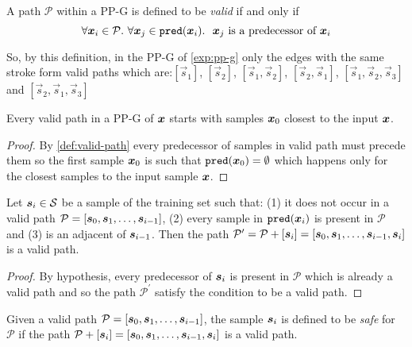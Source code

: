 \begin{definition}
\label{def:valid-path}
A path $\mathcal{P}$ within a \acs{PP-G} is defined to be \emph{valid} if and only if
\[
  \forall \x[i] \in \mathcal{P}.\ \forall \x[j] \in \pred{\x[i]}. \ \ \x[j] \text{ is a predecessor of } \x[i]
\]
\end{definition}

So, by this definition, in the \acs{PP-G} of \autoref{exp:pp-g} only the edges with the same stroke form valid paths which are:$[\vec{s}_1]$, $[\vec{s}_2]$, $[\vec{s}_1, \vec{s}_2]$, $[\vec{s}_2, \vec{s}_1]$, $[\vec{s}_1, \vec{s}_2, \vec{s}_3]$ and $[\vec{s}_2, \vec{s}_1, \vec{s}_3]$

\begin{proposition}
  \label{prop:starting-sample}
Every valid path in a \acs{PP-G} of $\vinput$ starts with samples $\x[0]$ closest to the input $\vinput$.
\end{proposition}
\begin{proof}
By \autoref{def:valid-path} every predecessor of samples in valid path must precede them so the first sample $\x[0]$ is such that $\pred{\x[0]} = \emptyset$ which happens only for the closest samples to the input sample $\vinput$.
\end{proof}

\begin{proposition}
\label{prop:safe-condition}
  Let $\sample[i] \in \set$ be a sample of the training set such that: (1) it does not occur in a valid path $\mathcal{P} = [\sample[0], \sample[1],\ldots, \sample[i-1]]$, (2) every sample in $\pred{\x[i]}$ is present in $\mathcal{P}$ and (3) is an adjacent of $\sample[i-1]$. Then the path $\mathcal{P}^\prime = \mathcal{P} + [\sample[i]]=[\sample[0], \sample[1],\ldots, \sample[i-1], \sample[i]]$ is a valid path.
\end{proposition}
\begin{proof}
By hypothesis, every predecessor of $\sample[i]$ is present in $\mathcal{P}$ which is already a valid path and so the path $\mathcal{P}^\prime$ satisfy the condition to be a valid path.
\end{proof}

\begin{definition}
\label{def:safe-sample}
Given a valid path $\mathcal{P} = [\sample[0], \sample[1],\ldots, \sample[i-1]]$, the sample $\sample[i]$ is defined to be \emph{safe} for $\mathcal{P}$ if the path $\mathcal{P} + [\sample[i]] = [\sample[0], \sample[1],\ldots, \sample[i-1], \sample[i]]$ is a valid path.
\end{definition}

